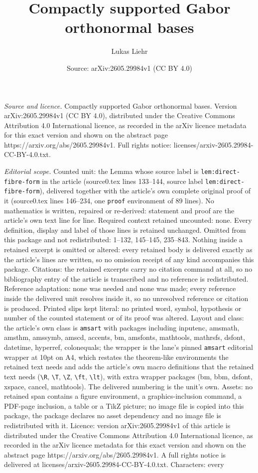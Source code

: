 \documentclass[10pt,a4paper]{amsart}
\title[Compactly supported Gabor orthonormal bases]{Compactly supported Gabor orthonormal bases}
\author{Lukas Liehr}
\date{Source: arXiv:2605.29984v1 (CC BY 4.0)}
\begin{document}
\maketitle

\noindent\emph{Source and licence.} Compactly supported Gabor orthonormal bases. Version arXiv:2605.29984v1 (CC BY 4.0), distributed under the Creative Commons Attribution 4.0 International licence, as recorded in the arXiv licence metadata for this exact version and shown on the abstract page https://arxiv.org/abs/2605.29984v1. Full rights notice: licenses/arxiv-2605.29984-CC-BY-4.0.txt.\par\smallskip

\noindent\textit{Editorial scope.} Counted unit: the Lemma whose source label is \texttt{lem:direct-fibre-form} in the article (source0.tex lines 133--144, source label \texttt{lem:direct-fibre-form}), delivered together with the article's own complete original proof of it (source0.tex lines 146--234, one \texttt{proof} environment of 89 lines). No mathematics is written, repaired or re-derived: statement and proof are the article's own text line for line. Required context retained uncounted: none. Every definition, display and label of those lines is retained unchanged. Omitted from this package and not redistributed: 1--132, 145--145, 235--843. Nothing inside a retained excerpt is omitted or altered: every retained body is delivered exactly as the article's lines are written, so no omission receipt of any kind accompanies this package. Citations: the retained excerpts carry no citation command at all, so no bibliography entry of the article is transcribed and no reference is redistributed. Reference adaptation: none was needed and none was made; every reference inside the delivered unit resolves inside it, so no unresolved reference or citation is produced. Printed slips kept literal: no printed word, symbol, hypothesis or number of the counted statement or of its proof was altered. Layout and class: the article's own class is \texttt{amsart} with packages including inputenc, amsmath, amsthm, amssymb, amscd, accents, bm, amsfonts, mathtools, mathrsfs, dsfont, datetime, hyperref, colonequals; the wrapper is the lane's pinned \texttt{amsart} editorial wrapper at 10pt on A4, which restates the theorem-like environments the retained text needs and adds the article's own macro definitions that the retained text needs (\texttt{\textbackslash R}, \texttt{\textbackslash T}, \texttt{\textbackslash Z}, \texttt{\textbackslash ft}, \texttt{\textbackslash lt}), with extra wrapper packages (bm, bbm, dsfont, xspace, cancel, mathtools). The delivered numbering is the unit's own. Assets: no retained span contains a figure environment, a graphics-inclusion command, a PDF-page inclusion, a table or a TikZ picture; no image file is copied into this package, the package declares no asset dependency and no image file is redistributed with it. Licence: version arXiv:2605.29984v1 of this article is distributed under the Creative Commons Attribution 4.0 International licence, as recorded in the arXiv licence metadata for this exact version and shown on the abstract page https://arxiv.org/abs/2605.29984v1. A full rights notice is delivered at licenses/arxiv-2605.29984-CC-BY-4.0.txt. Characters: every 
\end{document}

